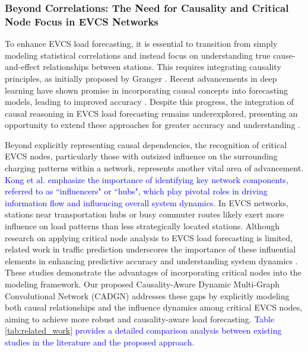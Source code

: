 \documentclass[lettersize,journal]{IEEEtran}
\newcommand{\hl}[1]{\textcolor{blue}{#1}}
\begin{document}

\subsubsection{Beyond Correlations: The Need for Causality and Critical Node Focus in EVCS Networks} 
\label{subsec:causal_critical}

To enhance EVCS load forecasting, it is essential to transition from simply modeling statistical correlations and instead focus on understanding true cause-and-effect relationships between stations. This requires integrating causality principles, as initially proposed by Granger \cite{granger1969investigating}. Recent advancements in deep learning have shown promise in incorporating causal concepts into forecasting models, leading to improved accuracy \cite{10448031, massidda2023total}. Despite this progress, the integration of causal reasoning in EVCS load forecasting remains underexplored, presenting an opportunity to extend these approaches for greater accuracy and understanding \cite{liang2023effects}.

Beyond explicitly representing causal dependencies, the recognition of critical EVCS nodes, particularly those with outsized influence on the surrounding charging patterns within a network, represents another vital area of advancement. 
\hl{Kong et al. \cite{kong2024spatio} emphasize the importance of identifying key network components, referred to as ``influencers" or ``hubs", which play pivotal roles in driving information flow and influencing overall system dynamics.}
In EVCS networks, stations near transportation hubs or busy commuter routes likely exert more influence on load patterns than less strategically located stations. Although research on applying critical node analysis to EVCS load forecasting is limited, related work in traffic prediction \cite{jiang2022graph} underscores the importance of these influential elements in enhancing predictive accuracy and understanding system dynamics \cite{yu2020identifying}. These studies demonstrate the advantages of incorporating critical nodes into the modeling framework. Our proposed Causality-Aware Dynamic Multi-Graph Convolutional Network (CADGN) addresses these gaps by explicitly modeling both causal relationships and the influence dynamics among critical EVCS nodes, aiming to achieve more robust and causality-aware load forecasting.
\hl{Table \ref{tab:related_work} provides a detailed comparison analysis between existing studies in the literature and the proposed approach.}
\end{document}
